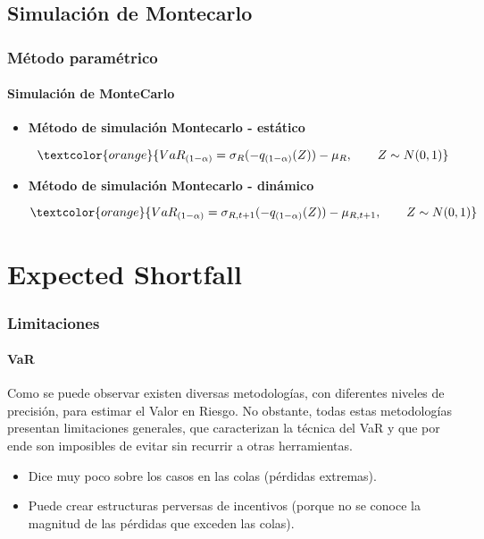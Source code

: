 \documentclass[aspectratio=169]{beamer}
\begin{document}
\subsection{Simulación de Montecarlo}
\begin{frame}
\frametitle{Método paramétrico}
\framesubtitle{Simulación de MonteCarlo}



\begin{itemize}
\item \textbf{Método de simulación Montecarlo - estático}

\begin{equation}
\textcolor{orange}{VaR_{(1-\alpha)} = \sigma_R(-q_{(1-\alpha)}(Z))  - \mu_R, \quad \quad Z\sim N(0,1)}  \nonumber
\end{equation}


\vspace{4mm}

\item \textbf{Método de simulación Montecarlo - dinámico}


\begin{equation}
\textcolor{orange}{VaR_{(1-\alpha)} = \sigma_{R,t+1}(-q_{(1-\alpha)}(Z))  - \mu_{R,t+1}, \quad \quad Z\sim N(0,1)}  \nonumber
\end{equation}

\end{itemize}



\end{frame}








\section{Expected Shortfall}
\begin{frame}
\frametitle{Limitaciones}
\framesubtitle{VaR}


Como se puede observar existen diversas metodologías, con diferentes niveles de precisión, para estimar el Valor en Riesgo. No obstante, todas estas metodologías presentan limitaciones generales, que caracterizan la técnica del VaR y que por ende son imposibles de evitar sin recurrir a otras herramientas.


\begin{block}{}
\begin{itemize}
\item Dice muy poco sobre los casos en las colas (pérdidas extremas).
\item Puede crear estructuras perversas de incentivos (porque no se
conoce la magnitud de las pérdidas que exceden las colas).

\end{itemize}
\end{block}


\end{frame}
\end{document}
